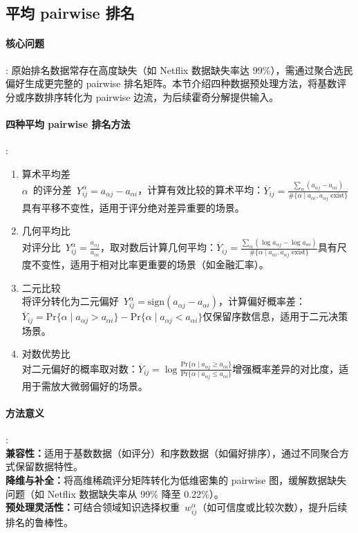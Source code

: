 \documentclass[a4paper]{article}
\begin{document}
\subsection{平均 pairwise 排名}
\paragraph{核心问题}:
原始排名数据常存在高度缺失（如 Netflix 数据缺失率达 99\%），需通过聚合选民偏好生成更完整的 pairwise 排名矩阵。本节介绍四种数据预处理方法，将基数评分或序数排序转化为 pairwise 边流，为后续霍奇分解提供输入。

\paragraph{四种平均 pairwise 排名方法}:
\begin{enumerate}
    \item 算术平均差 \\ 
        \(\alpha\) 的评分差 \(Y_{ij}^{\alpha} = a_{\alpha j} - a_{\alpha i}\)，计算有效比较的算术平均：\(\overline{Y}_{ij} = \frac{\sum_{\alpha} (a_{\alpha j} - a_{\alpha i})}{\#\{\alpha \mid a_{\alpha i}, a_{\alpha j} \text{ exist}\}}\)具有平移不变性，适用于评分绝对差异重要的场景。
    \item 几何平均比 \\
        对评分比 \(Y_{ij}^{\alpha} = \frac{a_{\alpha j}}{a_{\alpha i}}\)，取对数后计算几何平均：\(\overline{Y}_{ij} = \frac{\sum_{\alpha} (\log a_{\alpha j} - \log a_{\alpha i})}{\#\{\alpha \mid a_{\alpha i}, a_{\alpha j} \text{ exist}\}}\)具有尺度不变性，适用于相对比率更重要的场景（如金融汇率）。
    \item 二元比较 \\
    将评分转化为二元偏好 \(Y_{ij}^{\alpha} = \text{sign}(a_{\alpha j} - a_{\alpha i})\)，计算偏好概率差：\(\overline{Y}_{ij} = \text{Pr}\{\alpha \mid a_{\alpha j} > a_{\alpha i}\} - \text{Pr}\{\alpha \mid a_{\alpha j} < a_{\alpha i}\}\)仅保留序数信息，适用于二元决策场景。
    \item 对数优势比 \\
    对二元偏好的概率取对数：\(\overline{Y}_{ij} = \log \frac{\text{Pr}\{\alpha \mid a_{\alpha j} \geq a_{\alpha i}\}}{\text{Pr}\{\alpha \mid a_{\alpha j} \leq a_{\alpha i}\}}\)增强概率差异的对比度，适用于需放大微弱偏好的场景。
\end{enumerate}
\paragraph{方法意义}:\\
\indent \textbf{兼容性：}适用于基数数据（如评分）和序数数据（如偏好排序），通过不同聚合方式保留数据特性。\\
\indent \textbf{降维与补全：}将高维稀疏评分矩阵转化为低维密集的 pairwise 图，缓解数据缺失问题（如 Netflix 数据缺失率从 99\% 降至 0.22\%）。\\
\indent \textbf{预处理灵活性：}可结合领域知识选择权重 \(w_{ij}^{\alpha}\)（如可信度或比较次数），提升后续排名的鲁棒性。
\end{document}
